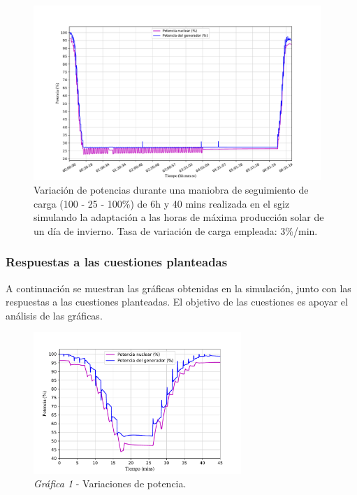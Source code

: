 \begin{enumerate}
    \begin{figure}[h]
      \centering
      \includegraphics[width=0.97\textwidth]{content/figures/sim2_potencias.pdf}
      \vspace{-0.3cm}
      \caption{Variación de potencias durante una maniobra de  seguimiento de carga (100 - 25 - 100\%) de 6h y 40 mins realizada en el \acrshort{sgiz} simulando la adaptación a las horas de máxima producción solar de un día de invierno. Tasa de variación de carga empleada: 3\%/min.}
      \label{fig:sim2_potencias}
    \end{figure} 

\end{enumerate}

\subsubsection{Respuestas a las cuestiones planteadas}

A continuación se muestran las gráficas obtenidas en la simulación, junto con las respuestas a las cuestiones planteadas. El objetivo de las cuestiones es apoyar el análisis de las gráficas. 

\begin{figure}[!h]
  \centering
  \includegraphics[width=0.7\textwidth]{content/figures/sim1_potencias.pdf}
  \vspace{-0.3cm}
  \caption{\textit{Gráfica 1} - Variaciones de potencia.}
  \label{fig:sim1_potencias}
\end{figure}

